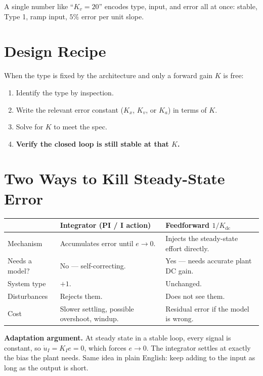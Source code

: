 \documentclass[11pt]{article}
\begin{document}
A single number like ``$K_v = 20$'' encodes type, input, and error all
at once: stable, Type 1, ramp input, $5\%$ error per unit slope.

\section*{Design Recipe}

When the type is fixed by the architecture and only a forward gain $K$ is
free:
\begin{enumerate}
  \item Identify the type by inspection.
  \item Write the relevant error constant ($K_x$, $K_v$, or $K_a$) in
    terms of $K$.
  \item Solve for $K$ to meet the spec.
  \item \textbf{Verify the closed loop is still stable at that $K$.}
\end{enumerate}

\section*{Two Ways to Kill Steady-State Error}

\begin{center}
\begin{tabular}{p{3.5cm}p{5.5cm}p{5.5cm}}
\toprule
                & \textbf{Integrator (PI / I action)}
                & \textbf{Feedforward $1/K_{\mathrm{dc}}$} \\
\midrule
Mechanism       & Accumulates error until $e\to 0$.
                & Injects the steady-state effort directly. \\[4pt]
Needs a model?  & No --- self-correcting.
                & Yes --- needs accurate plant DC gain. \\[4pt]
System type     & $+1$.
                & Unchanged. \\[4pt]
Disturbances    & Rejects them.
                & Does not see them. \\[4pt]
Cost            & Slower settling, possible overshoot, windup.
                & Residual error if the model is wrong. \\
\bottomrule
\end{tabular}
\end{center}

\textbf{Adaptation argument.}  At steady state in a stable loop, every
signal is constant, so $\dot u_I = K_I e = 0$, which forces $e \to 0$.
The integrator settles at exactly the bias the plant needs.  Same idea
in plain English: keep adding to the input as long as the output is
short.
\end{document}
